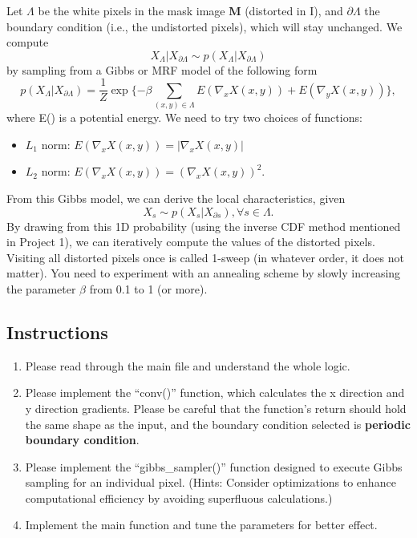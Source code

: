\documentclass[11pt]{article}
\begin{document}
 Let $\Lambda $ be the white pixels in the mask image \textbf{M} (distorted in I), and $\partial \Lambda $ the boundary condition (i.e., the undistorted pixels), which will stay unchanged. We compute
\begin{equation*}
  X_{\Lambda }| X_{\partial \Lambda } \sim  p(X_{\Lambda }|X_{\partial \Lambda })
\end{equation*}
by sampling from a Gibbs or MRF model of the following form
\begin{equation*}
p(X_{\Lambda }|X_{\partial \Lambda })=\frac{1}{Z} \exp\{ -\beta \sum _{(x,y)\in \Lambda } E(\nabla _{x} X(x,y))+ E(\nabla _{y}X(x,y)) \},
\end{equation*}
where E() is a potential energy. We need to try two choices of functions:\begin{itemize}
    \item $L_1$ norm: $E( \nabla_x X(x,y)) = |\nabla_x X(x,y)|$
    \item $L_2$ norm: $E( \nabla_x X(x,y)) = (\nabla_x X(x,y))^2$.
\end{itemize}
From this Gibbs model, we can derive the local characteristics, given
\begin{equation*}
    X_s \sim p(X_s|X_{\partial s}), \forall s \in \Lambda.
\end{equation*}
By drawing from this 1D probability (using the inverse CDF method mentioned in Project 1), we can iteratively compute the values of the distorted pixels. Visiting all distorted pixels once is called 1-sweep (in whatever order, it does not matter). You need to experiment with an annealing scheme by slowly increasing the parameter $\beta $ from 0.1 to 1 (or more).

\subsection{Instructions}

\begin{enumerate}
    \item Please read through the main file and understand the whole logic.
    \item Please implement the ``conv()'' function, which calculates the x direction and y direction gradients. Please be careful that the function's return should hold the same shape as the input, and the boundary condition selected is \textbf{periodic boundary condition}.    
    \item Please implement the ``gibbs\_sampler()'' function designed to execute Gibbs sampling for an individual pixel. (Hints: Consider optimizations to enhance computational efficiency by avoiding superfluous calculations.)
    \item Implement the main function and tune the parameters for better effect.
\end{enumerate}
\end{document}
